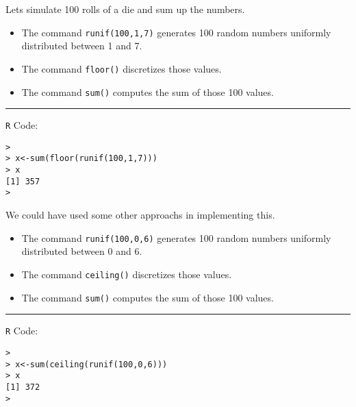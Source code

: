 Lets simulate 100 rolls of a die and sum up the numbers.\\
\begin{itemize}
\item The command \color{blue}\texttt{runif(100,1,7)}\color{black} generates 100 random numbers uniformly distributed between 1 and 7.
\item The command \color{blue}\texttt{floor()}\color{black} discretizes those values.
\item The command \color{blue}\texttt{sum()}\color{black} computes the sum of those 100 values.
\end{itemize}


\rule{12.1cm}{0.25mm}
\texttt{R} Code:
\begin{verbatim}
>
> x<-sum(floor(runif(100,1,7)))
> x
[1] 357
>
\end{verbatim}


%



We could have used some other approachs in implementing this.\\
\begin{itemize}
\item The command \color{blue}\texttt{runif(100,0,6)}\color{black} generates 100 random numbers uniformly distributed between 0 and 6.
\item The command \color{blue}\texttt{ceiling()}\color{black} discretizes those values.
\item The command \color{blue}\texttt{sum()}\color{black} computes the sum of those 100 values.
\end{itemize}


\rule{12.1cm}{0.25mm}
\texttt{R} Code:
\begin{verbatim}
>
> x<-sum(ceiling(runif(100,0,6)))
> x
[1] 372
>
\end{verbatim}
%


